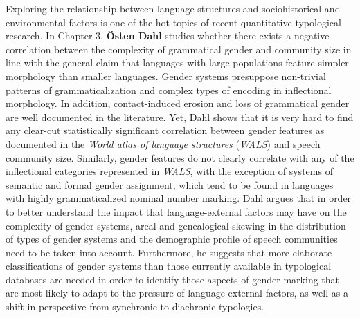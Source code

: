 \documentclass[output=collectionpaper]{langsci/langscibook}
\begin{document}
Exploring the relationship between language structures and sociohistorical and environmental factors is one of the hot topics of recent quantitative typological research. In Chapter 3, \textbf{Östen Dahl} studies whether there exists a negative correlation between the complexity of grammatical gender and community size in line with the general claim that languages with large populations feature simpler morphology than smaller languages. Gender systems presuppose non-trivial patterns of grammaticalization and complex types of encoding in inflectional morphology. In addition, contact-induced erosion and loss of grammatical gender are well documented in the literature. Yet, Dahl shows that it is very hard to find any clear-cut statistically significant correlation between gender features as documented in the \textit{World atlas of language structures} (\textit{WALS}) and speech community size. Similarly, gender features do not clearly correlate with any of the inflectional categories represented in \textit{WALS}, with the exception of systems of semantic and formal gender assignment, which tend to be found in languages with highly grammaticalized nominal number marking. Dahl argues that in order to better understand the impact that language-external factors may have on the complexity of gender systems, areal and genealogical skewing in the distribution of types of gender systems and the demographic profile of speech communities need to be taken into account. Furthermore, he suggests that more elaborate classifications of gender systems than those currently available in typological databases are needed in order to identify those aspects of gender marking that are most likely to adapt to the pressure of language-external factors, as well as a shift in perspective from synchronic to diachronic typologies.
\end{document}

